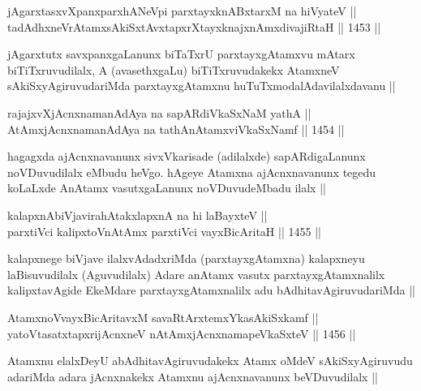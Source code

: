 \begin{shl}
jAgarxtasxvXpanxparxhANeV\s pi parxtayxknABxtarxM na hiVyateV ||  \\
tadAdhxneVrAtamxsAkiSxtAvxtapxrXtayxknajxnAmxdivajiRtaH ||  1453 ||  
\end{shl}

\begin{artha}
jAgarxtutx savxpanxgaLanunx biTaTxrU parxtayxgAtamxvu mAtarx biTiTxruvudilalx, A (avasethxgaLu) biTiTxruvudakekx AtamxneV sAkiSxyAgiruvudariMda parxtayxgAtamxnu huTuTxmodalAdavilalxdavanu ||
\end{artha}

\begin{shl}
rajajxvXjAcnxnamanAdAya na sapARdiVkaSxNaM yathA || \\
AtAmxjAcnxnamanAdAya na tathA\s nAtamxviVkaSxNamf ||  1454 ||  
\end{shl}

\begin{artha}
hagagxda ajAcnxnavanunx sivxVkarisade (adilalxde) sapARdigaLanunx noVDuvudilalx eMbudu heVgo. hAgeye Atamxna ajAcnxnavanunx tegedu koLaLxde AnAtamx vasutxgaLanunx noVDuvudeMbadu ilalx ||
\end{artha}


\begin{shl}
kalapxnAbiVjavirahAtakxlapxnA na hi laBayxteV ||  \\
parxtiVci kalipxtoV\s nAtAmx parxtiVci vayxBicAritaH ||  1455 ||  
\end{shl}

\begin{artha}
kalapxnege biVjave ilalxvAdadxriMda (parxtayxgAtamxna) kalapxneyu laBisuvudilalx (Aguvudilalx) Adare anAtamx vasutx parxtayxgAtamxnalilx kalipxtavAgide EkeMdare parxtayxgAtamxnalilx adu bAdhitavAgiruvudariMda ||
\end{artha}


\begin{shl}
AtamxnoV\s vayxBicAritavxM savaRtArx\s \s temxYkasAkiSxkamf || \\
yatoV\s tasatxtapxrijAcnxneV nA\s \s tAmx\s jAcnxnamapeVkaSxteV ||  1456 ||  
\end{shl}

\begin{artha}
Atamxnu elalxDeyU abAdhitavAgiruvudakekx Atamx oMdeV sAkiSxyAgiruvudu adariMda adara jAcnxnakekx Atamxnu ajAcnxnavanunx beVDuvudilalx ||
\end{artha}

